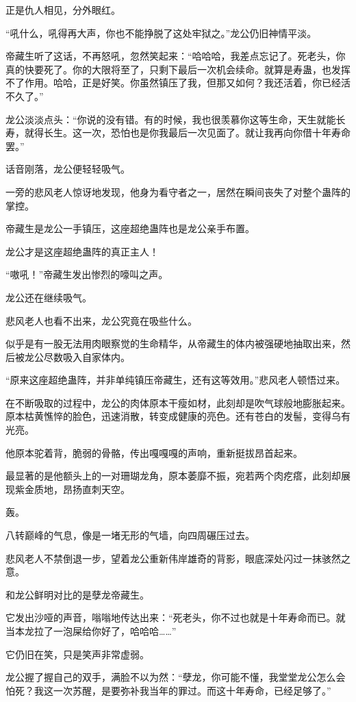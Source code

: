 \begin{this_body}
正是仇人相见，分外眼红。

“吼什么，吼得再大声，你也不能挣脱了这处牢狱之。”龙公仍旧神情平淡。

帝藏生听了这话，不再怒吼，忽然笑起来：“哈哈哈，我差点忘记了。死老头，你真的快要死了。你的大限将至了，只剩下最后一次机会续命。就算是寿蛊，也发挥不了作用。哈哈，正是好笑。你虽然镇压了我，但那又如何？我还活着，你已经活不久了。”

龙公淡淡点头：“你说的没有错。有的时候，我也很羡慕你这等生命，天生就能长寿，就得长生。这一次，恐怕也是你我最后一次见面了。就让我再向你借十年寿命罢。”

话音刚落，龙公便轻轻吸气。

一旁的悲风老人惊讶地发现，他身为看守者之一，居然在瞬间丧失了对整个蛊阵的掌控。

帝藏生是龙公一手镇压，这座超绝蛊阵也是龙公亲手布置。

龙公才是这座超绝蛊阵的真正主人！

“嗷吼！”帝藏生发出惨烈的嚎叫之声。

龙公还在继续吸气。

悲风老人也看不出来，龙公究竟在吸些什么。

似乎是有一股无法用肉眼察觉的生命精华，从帝藏生的体内被强硬地抽取出来，然后被龙公尽数吸入自家体内。

“原来这座超绝蛊阵，并非单纯镇压帝藏生，还有这等效用。”悲风老人顿悟过来。

在不断吸取的过程中，龙公的肉体原本干瘦如材，此刻却是吹气球般地膨胀起来。原本枯黄憔悴的脸色，迅速消散，转变成健康的亮色。还有苍白的发髻，变得乌有光亮。

他原本驼着背，脆弱的骨骼，传出嘎嘎嘎的声响，重新挺拔昂首起来。

最显著的是他额头上的一对珊瑚龙角，原本萎靡不振，宛若两个肉疙瘩，此刻却展现紫金质地，昂扬直刺天空。

轰。

八转巅峰的气息，像是一堵无形的气墙，向四周碾压过去。

悲风老人不禁倒退一步，望着龙公重新伟岸雄奇的背影，眼底深处闪过一抹骇然之意。

和龙公鲜明对比的是孽龙帝藏生。

它发出沙哑的声音，嗡嗡地传达出来：“死老头，你不过也就是十年寿命而已。就当本龙拉了一泡屎给你好了，哈哈哈……”

它仍旧在笑，只是笑声非常虚弱。

龙公握了握自己的双手，满脸不以为然：“孽龙，你可能不懂，我堂堂龙公怎么会怕死？我这一次苏醒，是要弥补我当年的罪过。而这十年寿命，已经足够了。”


\end{this_body}
